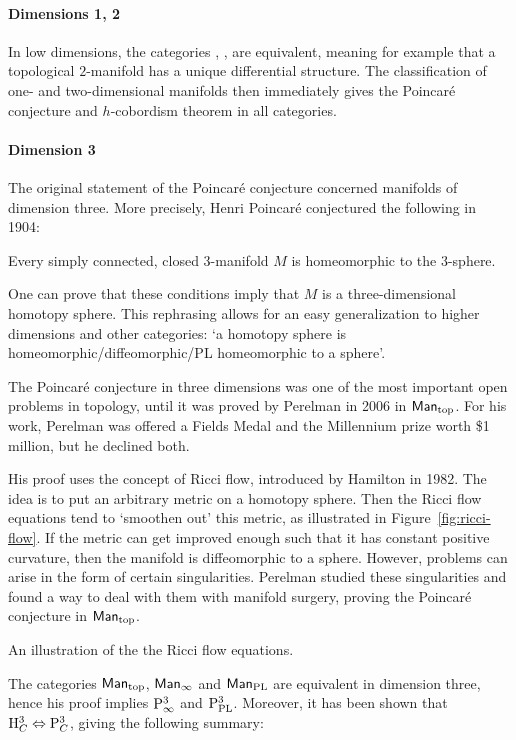 \paragraph{Dimensions 1, 2}
In low dimensions, the categories \mans, \mant, \manp{} are equivalent, meaning for example that a topological $2$-manifold has a unique differential structure.
The classification of one- and two-dimensional manifolds then immediately gives the Poincaré conjecture and $h$-cobordism theorem in all categories.


\paragraph{Dimension 3}
The original statement of the Poincaré conjecture concerned manifolds of dimension three.
More precisely, Henri Poincaré conjectured the following in 1904:
\begin{theorem}
    Every simply connected, closed $3$-manifold $M$ is homeomorphic to the $3$-sphere.
\end{theorem}
One can prove that these conditions imply that $M$ is a three-dimensional homotopy sphere.
This rephrasing allows for an easy generalization to higher dimensions and other categories: `a homotopy sphere is homeomorphic/diffeomorphic/PL homeomorphic to a sphere'.

The Poincaré conjecture in three dimensions was one of the most important open problems in topology, until it was proved by Perelman in 2006 in $\textsf{Man}_{\text{top}}$.
For his work, Perelman was offered a Fields Medal and the Millennium prize worth \$1 million, but he declined both.

His proof uses the concept of Ricci flow, introduced by Hamilton in 1982.
The idea is to put an arbitrary metric on a homotopy sphere.
Then the Ricci flow equations tend to `smoothen out' this metric, as illustrated in Figure~\ref{fig:ricci-flow}.
If the metric can get improved enough such that it has constant positive curvature, then the manifold is diffeomorphic to a sphere.
However, problems can arise in the form of certain singularities.
Perelman studied these singularities and found a way to deal with them with manifold surgery, proving the Poincaré conjecture in $\textsf{Man}_{\text{top}}$.
\begin{marginfigure}
    \centering
    \caption{An illustration of the the Ricci flow equations.}
    \label{fig:ricci-flow}
\end{marginfigure}
The categories $\textsf{Man}_{\text{top}}$,  $\textsf{Man}_{\infty}$ and  $\textsf{Man}_{\text{PL}}$ are equivalent in dimension three, hence his proof implies $\mathrm P_{\infty}^{3}$ and  $\mathrm P_{\text{PL}}^{3}$.
Moreover, it has been shown that $\mathrm H_{C}^{3} \Leftrightarrow \mathrm P_{C}^{3}$, giving the following summary:


